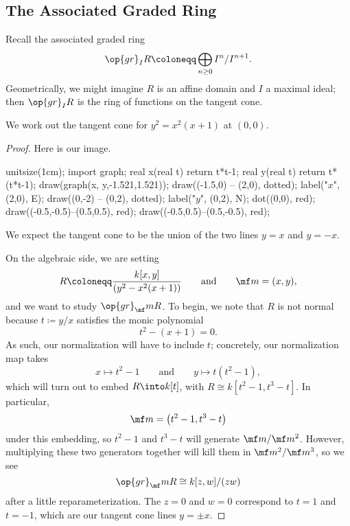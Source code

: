 \subsection{The Associated Graded Ring}
Recall the associated graded ring
\[\op{gr}_IR\coloneqq\bigoplus_{n\ge0}I^n/I^{n+1}.\]
Geometrically, we might imagine $R$ is an affine domain and $I$ a maximal ideal; then $\op{gr}_IR$ is the ring of functions on the tangent cone.
\begin{exe}
	We work out the tangent cone for $y^2=x^2(x+1)$ at $(0,0)$.
\end{exe}
\begin{proof}
	Here is our image.
	\begin{center}
		\begin{asy}
			unitsize(1cm);
			import graph;
			real x(real t)
			{
				return t*t-1;
			}
			real y(real t)
			{
				return t*(t*t-1);
			}
			draw(graph(x, y,-1.521,1.521));
			draw((-1.5,0) -- (2,0), dotted); label("$x$", (2,0), E);
			draw((0,-2) -- (0,2), dotted); label("$y$", (0,2), N);
			dot((0,0), red);
			draw((-0.5,-0.5)--(0.5,0.5), red);
			draw((-0.5,0.5)--(0.5,-0.5), red);
		\end{asy}
	\end{center}
	We expect the tangent cone to be the union of the two lines $y=x$ and $y=-x$.

	On the algebraic side, we are setting
	\[R\coloneqq\frac{k[x,y]}{\left(y^2-x^2(x+1)\right)}\qquad\text{and}\qquad\mf m=(x,y),\]
	and we want to study $\op{gr}_\mf mR$. To begin, we note that $R$ is not normal because $t\coloneqq y/x$ satisfies the monic polynomial
	\[t^2-(x+1)=0.\]
	As such, our normalization will have to include $t$; concretely, our normalization map takes
	\[x\mapsto t^2-1\qquad\text{and}\qquad y\mapsto t\left(t^2-1\right),\]
	which will turn out to embed $R\into k[t]$, with $R\cong k\left[t^2-1,t^3-t\right]$. In particular,
	\[\mf m=\left(t^2-1,t^3-t\right)\]
	under this embedding, so $t^2-1$ and $t^3-t$ will generate $\mf m/\mf m^2$. However, multiplying these two generators together will kill them in $\mf m^2/\mf m^3$, so we see
	\[\op{gr}_\mf mR\cong k[z,w]/(zw)\]
	after a little reparameterization. The $z=0$ and $w=0$ correspond to $t=1$ and $t=-1$, which are our tangent cone lines $y=\pm x$.
\end{proof}

